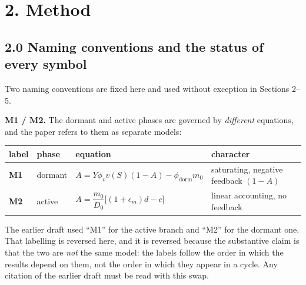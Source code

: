 \documentclass[11pt,a4paper]{article}
\newcounter{none}
\begin{document}

\section{2. Method}\label{method}

\subsection{2.0 Naming conventions and the status of every symbol}\label{naming-conventions-and-the-status-of-every-symbol}

Two naming conventions are fixed here and used without exception in Sections 2--5.

\textbf{M1 / M2.} The dormant and active phases are governed by \emph{different} equations,
and the paper refers to them as separate models:

{\def\LTcaptype{none} %
\begin{longtable}[]{@{}
  >{\raggedright\arraybackslash}p{}
  >{\raggedright\arraybackslash}p{}
  >{\raggedright\arraybackslash}p{}
  >{\raggedright\arraybackslash}p{}@{}}
\toprule\noalign{}
\begin{minipage}[b]{\linewidth}\raggedright
label
\end{minipage} & \begin{minipage}[b]{\linewidth}\raggedright
phase
\end{minipage} & \begin{minipage}[b]{\linewidth}\raggedright
equation
\end{minipage} & \begin{minipage}[b]{\linewidth}\raggedright
character
\end{minipage} \\
\midrule\noalign{}
\endhead
\bottomrule\noalign{}
\endlastfoot
\textbf{M1} & dormant & \(\dot A = Y\phi_v v(S)(1-A)-\phi_{\mathrm{dorm}}m_0\) & saturating, negative feedback \((1-A)\) \\
\textbf{M2} & active & \(\dot A = \dfrac{m_0}{D_0}\big[(1+\epsilon_m)d-c\big]\) & linear accounting, no feedback \\
\end{longtable}
}

The earlier draft used ``M1'' for the active branch and ``M2'' for the dormant one.
That labelling is reversed here, and it is reversed because the substantive claim
is that the two are \emph{not} the same model: the labels follow the order in which
the results depend on them, not the order in which they appear in a cycle. Any
citation of the earlier draft must be read with this swap.
\end{document}
